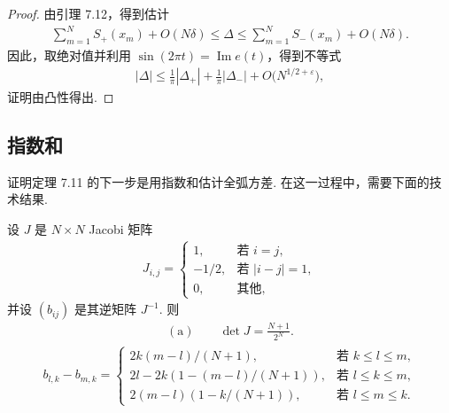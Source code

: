 \begin{proof}
由引理 7.12，得到估计
\begin{align*}
  \sum_{m=1}^{N}S_{+}(x_{m})+O\left(N\delta\right)\leq\Delta\leq
  \sum_{m=1}^{N}S_{-}(x_{m})+O\left(N\delta\right).
\end{align*}
因此，取绝对值并利用 $\sin(2\pi t) = \operatorname{Im} e(t)$，得到不等式
\begin{align*}
  |\Delta|\leq\frac{1}{\pi}\left|\Delta_{+}\right|+\frac{1}{\pi}\left|\Delta_{-}\right|+O\bigl(N^{1/2+\varepsilon}\bigr),
\end{align*}
证明由凸性得出.
\end{proof}

\subsection{指数和}

证明定理 7.11 的下一步是用指数和估计全弧方差. 在这一过程中，需要下面的技术结果.

\begin{lemma}\label{lem:7.14}
设 $J$ 是 $N \times N$ Jacobi 矩阵
\begin{align*}
  J_{i,j}=\begin{cases}
    1, & \text{若 } i=j,\\
    -1/2, & \text{若 } |i-j|=1,\\
    0, & \text{其他},
  \end{cases}
\end{align*}
并设 $(b_{ij})$ 是其逆矩阵 $J^{-1}$. 则
\begin{align*}
  \mathrm{(a)}\qquad \det J=\frac{N+1}{2^{N}}.
\end{align*}
\begin{align*}
  b_{l,k}-b_{m,k}=\begin{cases}
    2k(m-l)/(N+1), & \text{若 } k\leq l\leq m,\\
    2l-2k(1-(m-l)/(N+1)), & \text{若 } l\leq k\leq m,\\
    2(m-l)(1-k/(N+1)), & \text{若 } l\leq m\leq k.
  \end{cases}
\end{align*}
\end{lemma}

